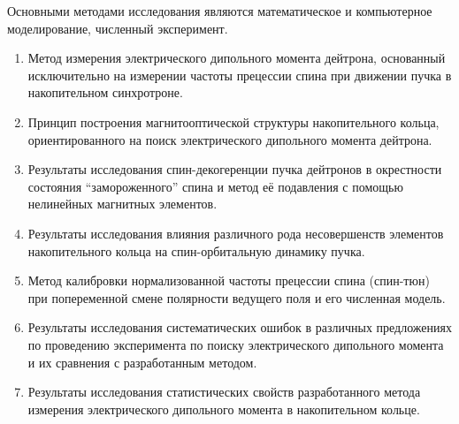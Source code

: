 {\methods} Основными методами исследования являются математическое и компьютерное моделирование,
численный эксперимент.

{}
\begin{enumerate}
	\item Метод измерения электрического дипольного момента дейтрона, основанный исключительно на измерении частоты прецессии спина при движении пучка в накопительном синхротроне.
	\item Принцип построения магнитооптической структуры накопительного кольца, ориентированного на поиск электрического дипольного момента дейтрона.
	\item Результаты исследования спин-декогеренции пучка дейтронов в окрестности состояния ``замороженного'' спина и метод её подавления с помощью нелинейных магнитных элементов.
	\item Результаты исследования влияния различного рода несовершенств элементов накопительного кольца 
	на спин-орбитальную динамику пучка. 
	\item Метод калибровки нормализованной частоты прецессии спина (спин-тюн) при попеременной смене полярности ведущего поля и его численная модель.
	\item Результаты исследования систематических ошибок в различных предложениях по проведению эксперимента по поиску электрического дипольного момента и их сравнения с разработанным методом. 
	\item Результаты исследования статистических свойств разработанного метода измерения электрического дипольного момента	в накопительном кольце.

\end{enumerate}
